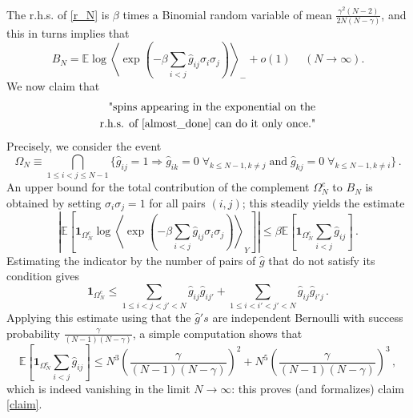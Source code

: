 \documentclass[a4paper,12pt,oneside,reqno]{amsart}
\numberwithin{equation}{section}
\begin{document}
The r.h.s. of \eqref{r_N} is $\beta$ times a Binomial random variable of mean 
$\frac{\gamma^2 \left(N-2\right)}{2N\left(N-\gamma\right)}$, and this in turns implies  that
\begin{equation} \label{almost_done}
B_N = {{\mathbb{E}}} \log \left< \exp\left( -  {\beta} \sum_{i<j} \hat g_{ij}  {\sigma}_i {\sigma}_j \right) \right>_-  + o(1)\,\quad (N\to \infty).
\end{equation}
We now claim that 
\begin{equation} \begin{aligned} \label{claim}
\text{"spins appearing in the exponential on the}\\ 
\text{r.h.s. of \eqref{almost_done} can do it only once."}
\end{aligned} \end{equation} 
Precisely, we consider the event 
\begin{equation} \label{only_once}
\Omega_N {\equiv} \bigcap\limits_{1 \leq i < j \leq N-1} \Big\{ \hat g_{ij} = 1 \Rightarrow 
 \hat g_{ik}=0 \; \forall_{k\leq N-1, k \neq j}\; \text{and}\; \hat g_{kj}=0 \; \forall_{k\leq N-1, k \neq i} 
\Big\} \,.
\end{equation} 
An upper bound for the total contribution of the complement $\Omega_N^c$ to $B_N$ is obtained by setting ${\sigma}_i {\sigma}_j = 1$ for all pairs $(i,j)$; this steadily yields the estimate
\begin{equation}  \label{noc}
\left| {{\mathbb{E}}}\left[ \boldsymbol{1}_{\Omega^c_N} \log \left< \exp\left( -  {\beta} \sum_{i<j} \hat g_{ij}  {\sigma}_i {\sigma}_j \right) \right>_Y  \right] \right| \leq  {\beta} {{\mathbb{E}}}\left[ \boldsymbol{1}_{\Omega^c_N}\sum_{i<j} \hat g_{ij} \right] \,.
\end{equation}
Estimating the indicator by the number of pairs of $\hat g$ that do not satisfy its condition gives
\begin{equation} \label{missing_bounds}
\boldsymbol{1}_{\Omega^c_N} \leq \sum\limits_{1\leq i<j<j'<N} \hat{g}_{ij} \hat{g}_{ij'} + \sum\limits_{1\leq i<i'<j'<N} \hat{g}_{ij} \hat{g}_{i'j}\,.
\end{equation}
Applying this estimate using that the $\hat g's$ are independent Bernoulli with success probability $\frac{\gamma}{(N-1)(N-\gamma)}$, a simple computation shows that 
\begin{equation} 
{{\mathbb{E}}}\left[ \boldsymbol{1}_{\Omega^c_N}\sum_{i<j} \hat g_{ij}\right] \leq N^3 \left(\frac{\gamma}{\left(N-1\right)\left(N-\gamma\right)}\right)^2+N^5\left(\frac{\gamma}{\left(N-1\right)\left(N-\gamma\right)}\right)^3 \,,
\end{equation}
which is indeed vanishing in the limit $N\to \infty$: this proves (and formalizes) claim \eqref{claim}. 
\end{document}
